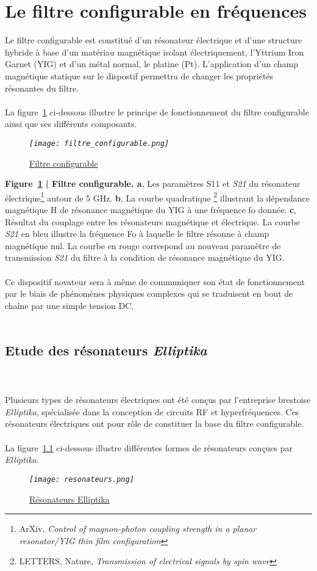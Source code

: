 \documentclass[12pt,fleqn]{book} %
\begin{document}
\part{Le filtre configurable en fréquences}
Le filtre configurable est constitué d’un résonateur électrique et d’une
structure hybride à base d’un matériau magnétique isolant électriquement, l’Yttrium
Iron Garnet (YIG) et d’un métal normal, le platine (Pt). L’application d’un champ
magnétique statique sur le dispostif permettra de changer les propriétés résonantes du
filtre.
~\\\\La figure~\underline{\color{blue}\ref{filtre}} ci-dessous illustre le principe de fonctionnement du filtre configurable ainsi que ses différents composants.
\begin{figure}[H]
	\centering
	\itshape
	\texttt{[image: filtre\_configurable.png]}
	\caption{\label{filtre} \underline{Filtre configurable}}
\end{figure}
\noindent\footnotesize  \textbf{Figure~\underline{\color{blue}\ref{filtre}} | Filtre configurable. a}, Les paramètres S11 et \emph{S21} du résonateur électrique\footnote{ArXiv, \emph{Control of magnon-photon coupling strength in a planar resonator\slash YIG thin film configuration}} autour de 5 GHz. \textbf{b}, La courbe quadratique \footnote{LETTERS, Nature, \emph{Transmission of electrical signals by spin wave}} illustrant la dépendance magnétique H de résonance magnétique du YIG à une fréquence fo donnée. \textbf{c}, Résultat du couplage entre les résonateurs magnétique et électrique\footnotemark[2]. La courbe \emph{\emph{S21}} en bleu illustre la fréquence Fo à laquelle le filtre résonne à champ magnétique nul. La courbe en rouge correspond au nouveau paramètre de transmission \emph{S21} du filtre à la condition de résonance magnétique du YIG. 
~\\\\
\normalsize Ce dispositif novateur sera à même de communiquer son état de fonctionnement par le
biais de phénomènes physiques complexes qui se traduisent en bout de chaîne par une simple tension
DC.~\\\\

\setcounter{chapter}{0}
\chapter{Etude des résonateurs \emph{Elliptika}} 
~\\\\Plusieurs types de résonateurs électriques ont été conçus par l'entreprise brestoise \emph{Elliptika}, spécialisée dans la conception de circuits RF et hyperfréquences. Ces résonateurs électriques ont pour rôle de constituer la base du filtre configurable.
~\\\\La figure~\underline{\color{blue}\ref{resonateurs}} ci-dessous illustre différentes formes de résonateurs conçues par \emph{Elliptika}.
\begin{figure}[H]
	\centering
	\itshape
	\texttt{[image: resonateurs.png]}
	\caption{\label{resonateurs} \underline{Résonateurs Elliptika}}
\end{figure}
\end{document}
